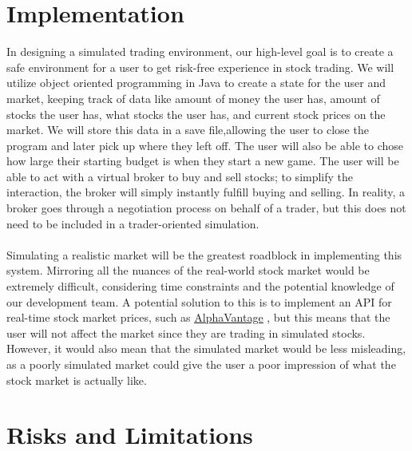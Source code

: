 \documentclass[12pt]{article}
\begin{document}
\section{Implementation}

In designing a simulated trading environment, our high-level goal is to create a safe environment for a user to get risk-free experience in stock trading. We will utilize object oriented programming in Java to create a state for the user and market, keeping track of data like amount of money the user has, amount of stocks the user has, what stocks the user has, and current stock prices on the market. We will store this data in a save file,allowing the user to close the program and later pick up where they left off. The user will also be able to chose how large their starting budget is when they start a new game. The user will be able to act with a virtual broker to buy and sell stocks; to simplify the interaction, the broker will simply instantly fulfill buying and selling. In reality, a broker goes through a negotiation process on behalf of a trader, but this does not need to be included in a trader-oriented simulation. 
\\ \\
Simulating a realistic market will be the greatest roadblock in implementing this system. Mirroring all the nuances of the real-world stock market would be extremely difficult, considering time constraints and the potential knowledge of our development team. A potential solution to this is to implement an API for real-time stock market prices, such as \color{blue}\underline{\href{https://www.alphavantage.co/}{AlphaVantage}} \color{black}, but this means that the user will not affect the market since they are trading in simulated stocks. However, it would also mean that the simulated market would be less misleading, as a poorly simulated market could give the user a poor impression of what the stock market is actually like.

\section{Risks and Limitations}
\end{document}
